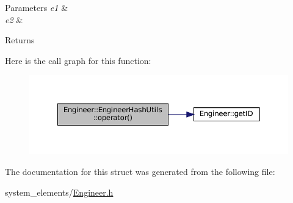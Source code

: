 \begin{DoxyParams}{Parameters}
{\em e1} & \\
\hline
{\em e2} & \\
\hline
\end{DoxyParams}
\begin{DoxyReturn}{Returns}

\end{DoxyReturn}
Here is the call graph for this function\+:
\nopagebreak
\begin{figure}[H]
\begin{center}
\leavevmode
\includegraphics[width=350pt]{structEngineer_1_1EngineerHashUtils_a4af5919a2a9ff2efd3ae3ec9171919d0_cgraph}
\end{center}
\end{figure}


The documentation for this struct was generated from the following file\+:\begin{DoxyCompactItemize}
\item 
system\+\_\+elements/\mbox{\hyperlink{Engineer_8h}{Engineer.\+h}}\end{DoxyCompactItemize}
